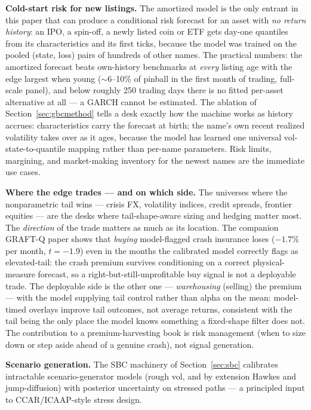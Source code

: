 \documentclass[11pt]{article}
\theoremstyle{remark}
\begin{document}
\textbf{Cold-start risk for new listings.} The amortized model is the
only entrant in this paper that can produce a conditional risk forecast
for an asset with \emph{no return history}: an IPO, a spin-off, a newly
listed coin or ETF gets day-one quantiles from its characteristics and
its first ticks, because the model was trained on the pooled
(state, loss) pairs of hundreds of other names. The practical numbers:
the amortized forecast beats own-history benchmarks at \emph{every}
listing age with the edge largest when young ($\sim$6--10\% of pinball
in the first month of trading, full-scale panel), and below roughly 250
trading days there is no fitted per-asset alternative at all --- a
GARCH cannot be estimated. The ablation of
Section~\ref{sec:gbcmethod} tells a desk exactly how the machine works
as history accrues: characteristics carry the forecast at birth; the
name's own recent realized volatility takes over as it ages, because the
model has learned one universal vol-state-to-quantile mapping rather
than per-name parameters. Risk limits, margining, and market-making
inventory for the newest names are the immediate use cases.

\textbf{Where the edge trades --- and on which side.} The universes where
the nonparametric tail wins --- crisis FX, volatility indices, credit
spreads, frontier equities --- are the desks where tail-shape-aware
sizing and hedging matter most. The \emph{direction} of the trade matters
as much as its location. The companion GRAFT-Q paper shows that
\emph{buying} model-flagged crash insurance loses ($-1.7\%$ per month,
$t=-1.9$) even in the months the calibrated model correctly flags as
elevated-tail: the crash premium survives conditioning on a correct
physical-measure forecast, so a right-but-still-unprofitable buy signal
is not a deployable trade. The deployable side is the other one ---
\emph{warehousing} (selling) the premium --- with the model supplying
tail control rather than alpha on the mean: model-timed overlays improve
tail outcomes, not average returns, consistent with the tail being the
only place the model knows something a fixed-shape filter does not. The
contribution to a premium-harvesting book is risk management (when to
size down or step aside ahead of a genuine crash), not signal generation.

\textbf{Scenario generation.} The SBC machinery of Section~\ref{sec:sbc}
calibrates intractable scenario-generator models (rough vol, and by
extension Hawkes and jump-diffusion) with posterior uncertainty on
stressed paths --- a principled input to CCAR/ICAAP-style stress
design.
\end{document}
